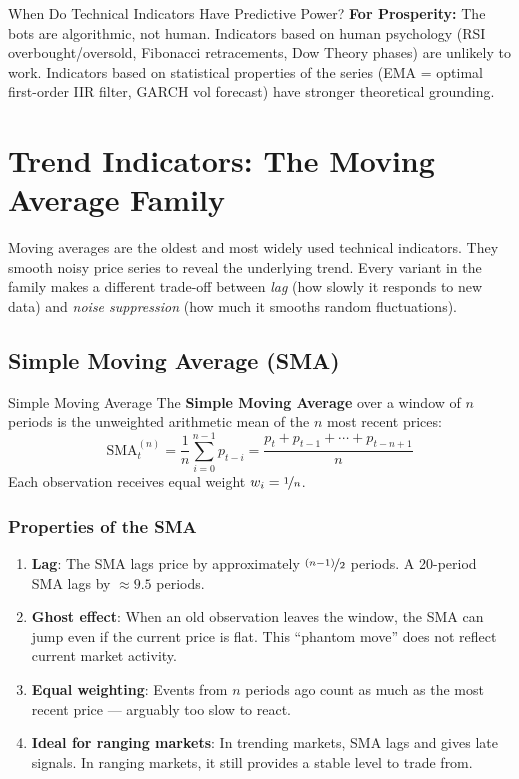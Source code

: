 \documentclass[12pt,a4paper,openany]{report}
\theoremstyle{definition}
\begin{document}
\begin{warningbox}{When Do Technical Indicators Have Predictive Power?}
\textbf{For Prosperity:} The bots are algorithmic, not human. Indicators based on human psychology (RSI overbought/oversold, Fibonacci retracements, Dow Theory phases) are unlikely to work. Indicators based on statistical properties of the series (EMA = optimal first-order IIR filter, GARCH vol forecast) have stronger theoretical grounding.
\end{warningbox}

\chapter{Trend Indicators: The Moving Average Family}

Moving averages are the oldest and most widely used technical indicators. They smooth noisy price series to reveal the underlying trend. Every variant in the family makes a different trade-off between \emph{lag} (how slowly it responds to new data) and \emph{noise suppression} (how much it smooths random fluctuations).

\section{Simple Moving Average (SMA)}

\begin{definitionbox}{Simple Moving Average}
The \textbf{Simple Moving Average} over a window of $n$ periods is the unweighted arithmetic mean of the $n$ most recent prices:
\[
  \text{SMA}_t^{(n)} = \frac{1}{n} \sum_{i=0}^{n-1} p_{t-i} = \frac{p_t + p_{t-1} + \cdots + p_{t-n+1}}{n}
\]
Each observation receives equal weight $w_i = \nicefrac{1}{n}$.
\end{definitionbox}

\subsection{Properties of the SMA}

\begin{enumerate}[label=\arabic*.]
  \item \textbf{Lag}: The SMA lags price by approximately $\nicefrac{(n-1)}{2}$ periods. A 20-period SMA lags by $\approx 9.5$ periods.
  \item \textbf{Ghost effect}: When an old observation leaves the window, the SMA can jump even if the current price is flat. This ``phantom move'' does not reflect current market activity.
  \item \textbf{Equal weighting}: Events from $n$ periods ago count as much as the most recent price — arguably too slow to react.
  \item \textbf{Ideal for ranging markets}: In trending markets, SMA lags and gives late signals. In ranging markets, it still provides a stable level to trade from.
\end{enumerate}
\end{document}
